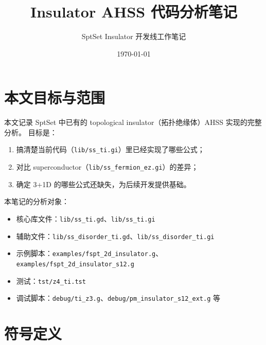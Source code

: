 \documentclass[a4paper,fontset=ubuntu,12pt]{ctexart}
\title{Insulator AHSS 代码分析笔记}
\author{SptSet Insulator 开发线工作笔记}
\date{\today}
\begin{document}
\maketitle
\tableofcontents

\section{本文目标与范围}
\label{sec:goal}

本文记录 SptSet 中已有的 topological insulator（拓扑绝缘体）AHSS 实现的完整分析。
目标是：
\begin{enumerate}
\item 搞清楚当前代码（\texttt{lib/ss\_ti.gi}）里已经实现了哪些公式；
\item 对比 superconductor（\texttt{lib/ss\_fermion\_ez.gi}）的差异；
\item 确定 3+1D 的哪些公式还缺失，为后续开发提供基础。
\end{enumerate}

本笔记的分析对象：
\begin{itemize}
\item 核心库文件：\texttt{lib/ss\_ti.gd}、\texttt{lib/ss\_ti.gi}
\item 辅助文件：\texttt{lib/ss\_disorder\_ti.gd}、\texttt{lib/ss\_disorder\_ti.gi}
\item 示例脚本：\texttt{examples/fspt\_2d\_insulator.g}、\texttt{examples/fspt\_2d\_insulator\_s12.g}
\item 测试：\texttt{tst/z4\_ti.tst}
\item 调试脚本：\texttt{debug/ti\_z3.g}、\texttt{debug/pm\_insulator\_s12\_ext.g} 等
\end{itemize}

\section{符号定义}
\label{sec:notation}
\end{document}
